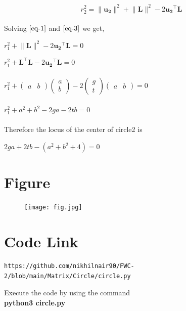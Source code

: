 \documentclass[journal,12pt,twocolumn]{IEEEtran}
\newcommand{\myvec}[1]{\ensuremath{\begin{pmatrix}#1\end{pmatrix}}}
\let\vec\mathbf
\begin{document}
\begin{equation}
r_2^2=\lVert{ \vec{u_2}}\rVert^2+\lVert{ \vec{L}}\rVert^2-2\vec{u_2}^{\top}\vec{ L}                  \label{eq-3}  
\end{equation}            
\\
Solving $\ref{eq-1}$ and $\ref{eq-3}$ we get,\\

\begin{center}
$ r_1^2+\lVert{\vec{L}}\rVert^2-2\vec{u_2}^{\top}\vec{L}= 0$
\end{center}
\vspace{0.4cm}

$r_1^2+\vec{L}^{\top}\vec{L}-2\vec{u_2}^{\top}\vec{L}=0$
\\
\\

$r_1^2+\myvec{a&b}\myvec{a\\b}-2\myvec{g\\t}\myvec{a&b}=0$
\\
\\

$r_1^2+a^2+b^2-2ga-2tb=0$
\\
\\

Therefore the locus of the center of circle2 is
\\
\begin{center}
$2ga+2tb-(a^2+b^2+4)=0$
\end{center}

\vspace*{3.5cm}

\section{\textbf{Figure}}
\vspace*{1cm}
\begin{figure}[h]
    \centering
\texttt{[image: fig.jpg]}
    \label{fig:my_label}
\end{figure}


\section{\textbf{Code Link}}

\begin{lstlisting}
https://github.com/nikhilnair90/FWC-2/blob/main/Matrix/Circle/circle.py
\end{lstlisting}
Execute the code by using the command\\
\textbf{python3 circle.py}
\end{document}
